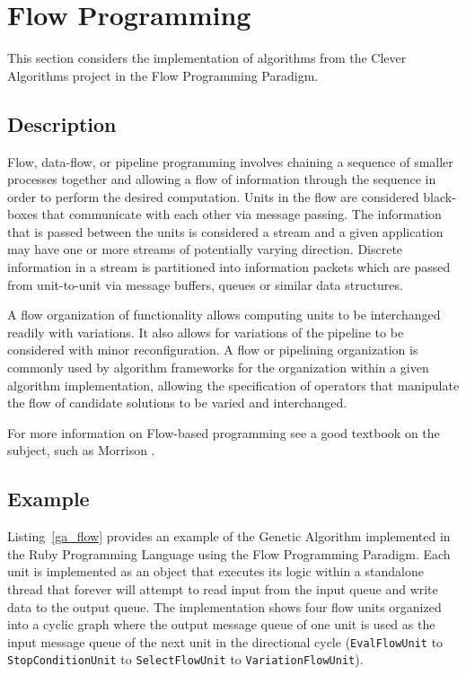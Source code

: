 \documentclass[a4paper, 11pt]{article}
\begin{document}
% 
% 
\section{Flow Programming}
\label{sec:flow}
This section considers the implementation of algorithms from the Clever Algorithms project in the Flow Programming Paradigm.

\subsection{Description}
Flow, data-flow, or pipeline programming involves chaining a sequence of smaller processes together and allowing a flow of information through the sequence in order to perform the desired computation. Units in the flow are considered black-boxes that communicate with each other via message passing. The information that is passed between the units is considered a stream and a given application may have one or more streams of potentially varying direction. Discrete information in a stream is partitioned into information packets which are passed from unit-to-unit via message buffers, queues or similar data structures.

A flow organization of functionality allows computing units to be interchanged readily with variations. It also allows for variations of the pipeline to be considered with minor reconfiguration. A flow or pipelining organization is commonly used by algorithm frameworks for the organization within a given algorithm implementation, allowing the specification of operators that manipulate the flow of candidate solutions to be varied and interchanged.

For more information on Flow-based programming see a good textbook on the subject, such as Morrison \cite{Morrison2010}.

\subsection{Example}
Listing~\ref{ga_flow} provides an example of the Genetic Algorithm implemented in the Ruby Programming Language using the Flow Programming Paradigm.
Each unit is implemented as an object that executes its logic within a standalone thread that forever will attempt to read input from the input queue and write data to the output queue. The implementation shows four flow units organized into a cyclic graph where the output message queue of one unit is used as the input message queue of the next unit in the directional cycle (\texttt{EvalFlowUnit} to \texttt{StopConditionUnit} to \texttt{SelectFlowUnit} to \texttt{VariationFlowUnit}). 
\end{document}
